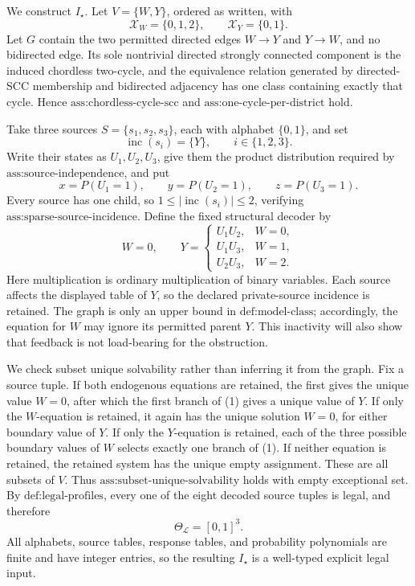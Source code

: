 We construct \(I_\star\).  Let \(V=\{W,Y\}\), ordered as written, with
\[
 \mathcal X_W=\{0,1,2\},\qquad \mathcal X_Y=\{0,1\}.
\]
Let \(G\) contain the two permitted directed edges \(W\to Y\) and \(Y\to W\), and no bidirected edge.  Its sole nontrivial directed strongly connected component is the induced chordless two-cycle, and the equivalence relation generated by directed-SCC membership and bidirected adjacency has one class containing exactly that cycle.  Hence \(\text{ass:chordless-cycle-scc}\) and \(\text{ass:one-cycle-per-district}\) hold.

Take three sources \(S=\{s_1,s_2,s_3\}\), each with alphabet \(\{0,1\}\), and set
\[
 \operatorname{inc}(s_i)=\{Y\},\qquad i\in\{1,2,3\}.
\]
Write their states as \(U_1,U_2,U_3\), give them the product distribution required by \(\text{ass:source-independence}\), and put
\[
 x=P(U_1=1),\qquad y=P(U_2=1),\qquad z=P(U_3=1).
\]
Every source has one child, so \(1\leq |\operatorname{inc}(s_i)|\leq2\), verifying \(\text{ass:sparse-source-incidence}\).  Define the fixed structural decoder by
\[
 W=0,
 \qquad
 Y=
 \begin{cases}
 U_1U_2,&W=0,\\
 U_1U_3,&W=1,\\
 U_2U_3,&W=2.
 \end{cases}
 \tag{1}
\]
Here multiplication is ordinary multiplication of binary variables.  Each source affects the displayed table of \(Y\), so the declared private-source incidence is retained.  The graph is only an upper bound in \(\text{def:model-class}\); accordingly, the equation for \(W\) may ignore its permitted parent \(Y\).  This inactivity will also show that feedback is not load-bearing for the obstruction.

We check subset unique solvability rather than inferring it from the graph.  Fix a source tuple.  If both endogenous equations are retained, the first gives the unique value \(W=0\), after which the first branch of (1) gives a unique value of \(Y\).  If only the \(W\)-equation is retained, it again has the unique solution \(W=0\), for either boundary value of \(Y\).  If only the \(Y\)-equation is retained, each of the three possible boundary values of \(W\) selects exactly one branch of (1).  If neither equation is retained, the retained system has the unique empty assignment.  These are all subsets of \(V\).  Thus \(\text{ass:subset-unique-solvability}\) holds with empty exceptional set.  By \(\text{def:legal-profiles}\), every one of the eight decoded source tuples is legal, and therefore
\[
 \Theta_{\mathcal L}=[0,1]^3.
\]
All alphabets, source tables, response tables, and probability polynomials are finite and have integer entries, so the resulting \(I_\star\) is a well-typed explicit legal input.

